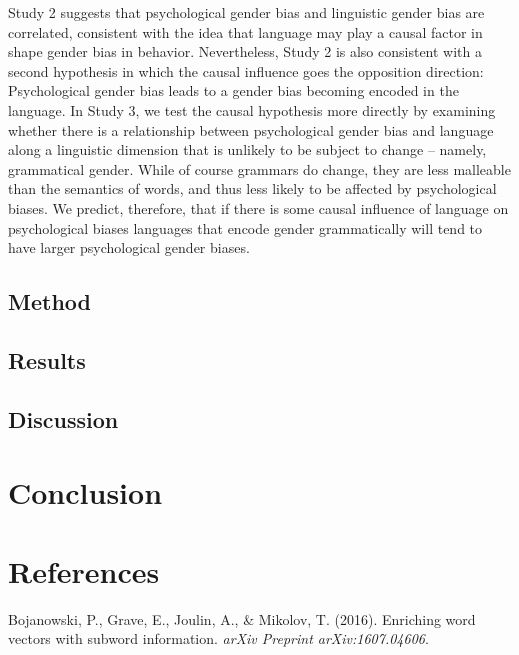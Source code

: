 \documentclass[10pt, letterpaper]{article}
\begin{document}
Study 2 suggests that psychological gender bias and linguistic gender
bias are correlated, consistent with the idea that language may play a
causal factor in shape gender bias in behavior. Nevertheless, Study 2 is
also consistent with a second hypothesis in which the causal influence
goes the opposition direction: Psychological gender bias leads to a
gender bias becoming encoded in the language. In Study 3, we test the
causal hypothesis more directly by examining whether there is a
relationship between psychological gender bias and language along a
linguistic dimension that is unlikely to be subject to change -- namely,
grammatical gender. While of course grammars do change, they are less
malleable than the semantics of words, and thus less likely to be
affected by psychological biases. We predict, therefore, that if there
is some causal influence of language on psychological biases languages
that encode gender grammatically will tend to have larger psychological
gender biases.

\subsection{Method}\label{method-3}

\subsection{Results}\label{results-3}

\subsection{Discussion}\label{discussion-2}

\section{Conclusion}\label{conclusion}

\section{References}\label{references}

\setlength{\parindent}{-0.1in} \setlength{\leftskip}{0.125in} \noindent

\hypertarget{refs}{}
\hypertarget{ref-bojanowski2016enriching}{}
Bojanowski, P., Grave, E., Joulin, A., \& Mikolov, T. (2016). Enriching
word vectors with subword information. \emph{arXiv Preprint
arXiv:1607.04606}.
\end{document}
